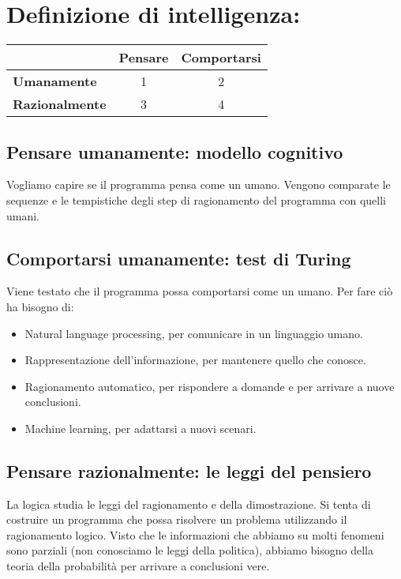 \chapter{Definizione di intelligenza:}

\begin{table}[h]
  \centering
    \begin{tabular}{lcc}
      & \textbf{Pensare} & \textbf{Comportarsi} \\
      \hline
      \textbf{Umanamente} & 1 & 2 \\
      \textbf{Razionalmente} & 3 & 4 \\
    \end{tabular}
\end{table}

\section{Pensare umanamente: modello cognitivo}

Vogliamo capire se il programma pensa come un umano. Vengono comparate le sequenze e le tempistiche degli step di ragionamento del programma con quelli umani.

\section{Comportarsi umanamente: test di Turing}

Viene testato che il programma possa comportarsi come un umano.
Per fare ciò ha bisogno di:

\begin{itemize}
  \item Natural language processing, per comunicare in un linguaggio umano.
  \item Rappresentazione dell'informazione, per mantenere quello che conosce.
  \item Ragionamento automatico, per rispondere a domande e per arrivare a nuove conclusioni.
  \item Machine learning, per adattarsi a nuovi scenari.
\end{itemize}

\section{Pensare razionalmente: le leggi del pensiero}

La logica studia le leggi del ragionamento e della dimostrazione.
Si tenta di costruire un programma che possa risolvere un problema utilizzando il ragionamento logico.
Visto che le informazioni che abbiamo su molti fenomeni sono parziali (non conosciamo le leggi della politica), abbiamo bisogno della teoria della probabilit\`a per arrivare a conclusioni vere.

